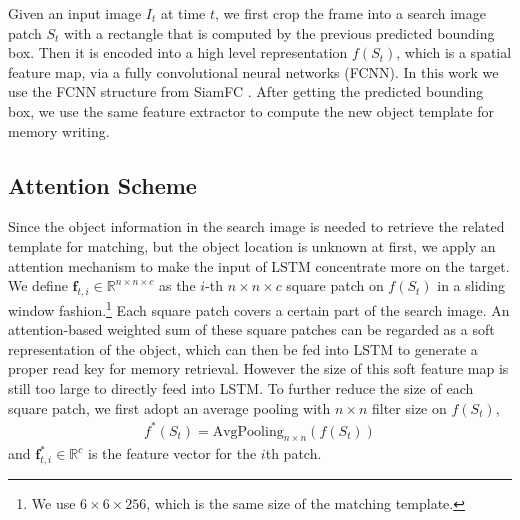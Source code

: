 \documentclass[runningheads]{llncs}
\newcommand{\yty}[1]{\textcolor{black}{#1}}
\begin{document}
Given an input image $I_t$ at time $t$, we first crop the frame into a search image patch $S_t$ with a rectangle that is computed by the previous predicted bounding box. Then it is encoded into a high level representation $f(S_t)$, which is a spatial feature map, via a fully convolutional neural networks (FCNN).  In this work we use the FCNN structure from SiamFC \cite{Bertinetto2016}. 
After getting the predicted bounding box, we use the same feature extractor to compute the new object template for memory writing.

%

\subsection{Attention Scheme}

Since the object information in the search image is needed to retrieve the related template for matching, but the object location is unknown at first, we apply an attention mechanism to make the input of LSTM concentrate more on the target.
We define $\mathbf{f}_{t,i} \in \mathbb{R}^{n \times n \times c}$ as the $i$-th $\mathit{n\times n\times c}$ square patch on $f(S_t)$ in a sliding window fashion.\footnote{We use $6\times6\times256$, which is the same size of the matching template.}
Each square patch covers a certain part of the search image. An attention-based weighted sum of these square patches can be regarded as a soft representation of the object, which can then be fed into LSTM to generate a proper read key for memory retrieval. However the size of this soft feature map is still too large to directly feed into LSTM. 
%
To further reduce the size of each square patch, %
we first adopt an average pooling with $n\times n$ filter size on $f(S_t)$,
\begin{align}
f^*(S_t) = \text{AvgPooling}_{n\times n}(f(S_t))
\end{align}
and $\mathbf{f}^*_{t,i} \in \mathbb{R}^{c}$ is the feature vector %
for the $i$th patch. 
\end{document}

